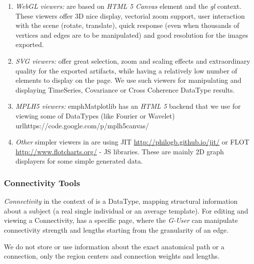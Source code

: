   \begin{enumerate}
    \item \emph{WebGL viewers:} are based on \emph{HTML 5 Canvas} element
    and the \emph{gl} context. These viewers offer 3D nice display,
    vectorial zoom support, user interaction with the scene (rotate,
    translate), quick response (even when thousands of vertices and edges
    are to be manipulated) and good resolution for the images exported.
    
    \item \emph{SVG viewers:} offer great selection, zoom and scaling
    effects and extraordinary quality for the exported artifacts, while
    having a relatively low number of elements to display on the page. We
    use such viewers for manipulating and displaying TimeSeries,
    Covariance or Cross Coherence DataType results.

    \item \emph{MPLH5 viewers:}  emph{Matplotlib} has an \emph{HTML 5}
    backend that we use for viewing some of \TVB DataTypes (like
    Fourier or Wavelet) url{https://code.google.com/p/mplh5canvas/}

    \item \emph{Other} simpler viewers in \TVB are using JIT
    \url{http://philogb.github.io/jit/} or FLOT
    \url{http://www.flotcharts.org/} - JS libraries. These are mainly
    2D graph displayers for some simple \TVB generated data.
  \end{enumerate}


\subsubsection{Connectivity Tools}

    \emph{Connectivity} in the context of \TVB is a DataType, mapping structural
    information about a subject (a real single individual or an average template). For
    editing and viewing a Connectivity, \TVB has a specific page, where
    the \emph{G-User} can manipulate connectivity strength and lengths
    starting from the granularity of an edge.

    We do not store or use information about the exact anatomical path or
    a connection, only the region centers and connection weights and
    lengths.

